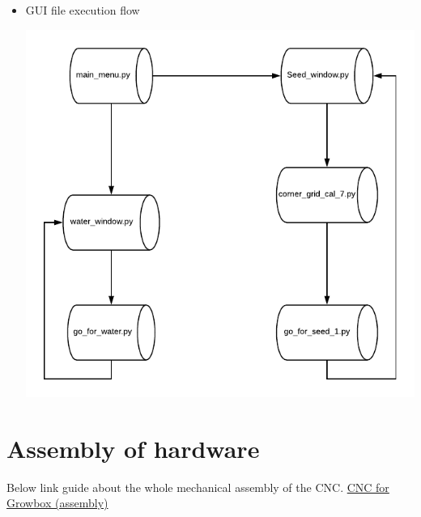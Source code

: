 \documentclass[a4paper,12pt,oneside]{book}
\begin{document}
\begin{itemize}
\begin{itemize}
\begin{center}
                \end{center}
            \item GUI file execution flow 
            \begin{center}
                    \includegraphics[scale=.5]{gui_flow.png}
                \end{center}
        \end{itemize}
\end{itemize}

\section{Assembly of hardware}

Below link guide about the whole mechanical assembly of the CNC.
\href{https://youtu.be/BbIcM0a_Fmc}{CNC for Growbox (assembly)} 
\end{document}
